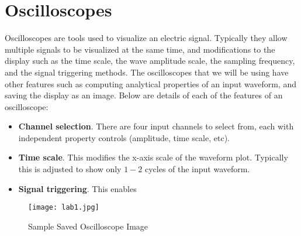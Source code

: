 \documentclass[main.tex]{subfile}
\begin{document}


\section{Oscilloscopes} 
\label{sec:oscilloscope}

Oscilloscopes are tools used to visualize an electric signal. Typically they
allow multiple signals to be visualized at the same time, and modifications to
the display such as the time scale, the wave amplitude scale, the sampling
frequency, and the signal triggering methods. The oscilloscopes that we will be
using have other features such as computing analytical properties of an input
waveform, and saving the display as an image. Below are details of each of the
features of an oscilloscope: 

\begin{itemize}
		\item \textbf{Channel selection}. There are four input channels to select
			from, each with independent property controls (amplitude, time scale,
			etc).
		\item \textbf{Time scale}. This modifies the x-axis scale of the waveform
			plot. Typically this is adjusted to show only $1-2$ cycles of the input waveform.
		\item \textbf{Signal triggering}. This enables 
\end{itemize}


\begin{figure}[H]
	\begin{center}
		\texttt{[image: lab1.jpg]}
	\end{center}
	\caption{Sample Saved Oscilloscope Image}
	\label{fig:sampleImage}
\end{figure}

\end{document}
